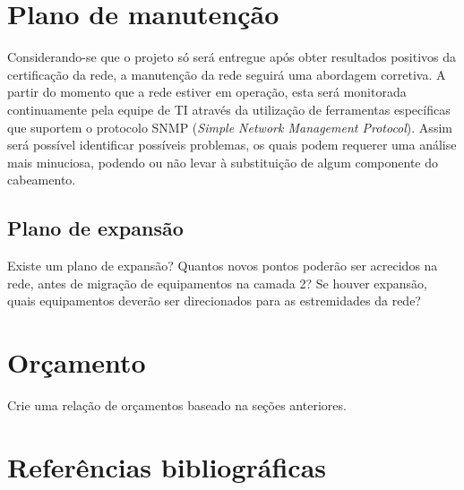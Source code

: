 \documentclass[	DIV=calc,%
							paper=a4,%
							fontsize=12pt,%
							onecolumn]{scrartcl}	 					%
\begin{document}
\section{Plano de manutenção}

Considerando-se que o projeto só será entregue após obter resultados positivos da certificação da rede, a manutenção da rede seguirá uma abordagem corretiva.
A partir do momento que a rede estiver em operação, esta será monitorada continuamente pela equipe de TI através da utilização de ferramentas específicas que suportem o protocolo SNMP (\textit{Simple Network Management Protocol}).
Assim será possível identificar possíveis problemas, os quais podem requerer uma análise mais minuciosa, podendo ou não levar à substituição de algum componente do cabeamento.


\subsection{Plano de expansão}
Existe um plano de expansão? Quantos novos pontos poderão ser acrecidos na rede, antes de migração de equipamentos na camada 2? Se houver expansão, quais equipamentos deverão ser direcionados para as estremidades da rede? 


\section{Orçamento}
Crie uma relação de orçamentos baseado na seções anteriores.





\section{Referências bibliográficas}




\renewcommand\refname{} %

  

\end{document}
